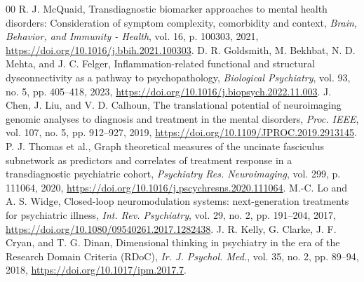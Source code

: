\documentclass[conference]{IEEEtran}
\begin{document}
\balance
\begin{thebibliography}{00}
 R. J. McQuaid, Transdiagnostic biomarker approaches to mental health disorders: Consideration of symptom complexity, comorbidity and context, \emph{Brain, Behavior, and Immunity - Health}, vol. 16, p. 100303, 2021, \url{https://doi.org/10.1016/j.bbih.2021.100303}.
 D. R. Goldsmith, M. Bekhbat, N. D. Mehta, and J. C. Felger, Inflammation-related functional and structural dysconnectivity as a pathway to psychopathology, \emph{Biological Psychiatry}, vol. 93, no. 5, pp. 405--418, 2023, \url{https://doi.org/10.1016/j.biopsych.2022.11.003}.
 J. Chen, J. Liu, and V. D. Calhoun, The translational potential of neuroimaging genomic analyses to diagnosis and treatment in the mental disorders, \emph{Proc. IEEE}, vol. 107, no. 5, pp. 912--927, 2019, \url{https://doi.org/10.1109/JPROC.2019.2913145}.
 P. J. Thomas et al., Graph theoretical measures of the uncinate fasciculus subnetwork as predictors and correlates of treatment response in a transdiagnostic psychiatric cohort, \emph{Psychiatry Res. Neuroimaging}, vol. 299, p. 111064, 2020, \url{https://doi.org/10.1016/j.pscychresns.2020.111064}.
 M.-C. Lo and A. S. Widge, Closed-loop neuromodulation systems: next-generation treatments for psychiatric illness, \emph{Int. Rev. Psychiatry}, vol. 29, no. 2, pp. 191--204, 2017, \url{https://doi.org/10.1080/09540261.2017.1282438}.
 J. R. Kelly, G. Clarke, J. F. Cryan, and T. G. Dinan, Dimensional thinking in psychiatry in the era of the Research Domain Criteria (RDoC), \emph{Ir. J. Psychol. Med.}, vol. 35, no. 2, pp. 89--94, 2018, \url{https://doi.org/10.1017/ipm.2017.7}.
\end{thebibliography}
\end{document}
